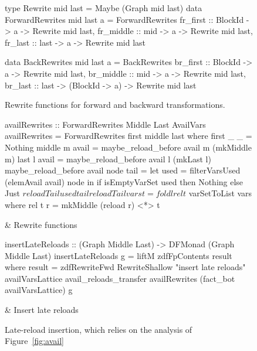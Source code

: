 \documentclass[blockstyle,preprint,nocopyrightspace]{sigplanconf}
\newcommand\seclabel[1]{\label{sec:#1}}
\newcommand\figref[1]{Figure~\ref{fig:#1}}
\newcommand\figlabel[1]{\label{fig:#1}}
\begin{document}
\seclabel{example-rewrites}

\begin{figure}
\begin{code}
type Rewrite mid last = Maybe (Graph mid last)
data ForwardRewrites mid last a = ForwardRewrites
 {fr_first  :: BlockId -> a -> Rewrite mid last,
  fr_middle :: mid     -> a -> Rewrite mid last,
  fr_last   :: last    -> a -> Rewrite mid last} 

data BackRewrites mid last a = BackRewrites
 {br_first  :: BlockId  -> a  -> Rewrite mid last,
  br_middle :: mid      -> a  -> Rewrite mid last,
  br_last   :: last ->
               (BlockId -> a) -> Rewrite mid last} 
\end{code}
\caption{Rewrite functions for forward and backward transformations.}
\figlabel{rewrites}
\end{figure}


\begin{figure*}
\begin{codetable}
\T\begin{code}
availRewrites :: ForwardRewrites Middle Last AvailVars
availRewrites = ForwardRewrites first middle last
  where first _ _ = Nothing
        middle m avail = maybe_reload_before avail m (mkMiddle m)
        last   l avail = maybe_reload_before avail l (mkLast l)
        maybe_reload_before avail node tail =
            let used = filterVarsUsed (elemAvail avail) node
            in  if isEmptyVarSet used then Nothing
                else Just $ reloadTail used tail
        reloadTail vars t = foldl rel t $ varSetToList vars
          where rel t r = mkMiddle (reload r) <*> t
\end{code}%
\B
& Rewrite \mbox{functions}\\
\hline

\T\begin{code}
insertLateReloads :: (Graph Middle Last) -> DFMonad (Graph Middle Last)
insertLateReloads g = liftM zdfFpContents result
  where result = zdfRewriteFwd RewriteShallow "insert late reloads"
                               availVarsLattice avail_reloads_transfer
                               availRewrites (fact_bot availVarsLattice) g
\end{code}%
& Insert late reloads\\
\end{codetable}
\caption{Late-reload insertion, which relies on the analysis of \figref{avail}}
\figlabel{avail-rewrites}
\end{figure*}
\end{document}

